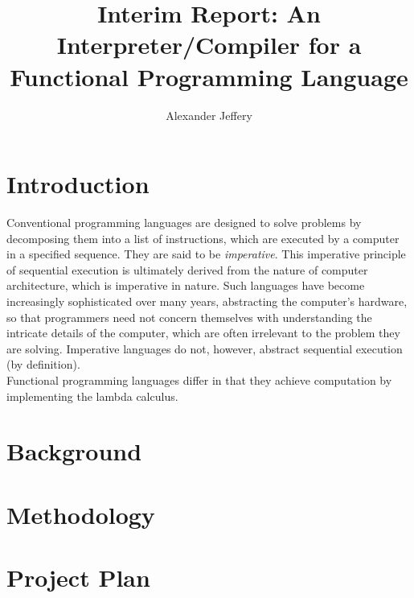 \documentclass{article}
\title{\textbf{Interim Report}: An Interpreter/Compiler for a Functional Programming Language}
\author{Alexander Jeffery}
\begin{document}
\maketitle

\section{Introduction}

Conventional programming languages are designed to solve problems by decomposing them into a list of instructions, which are executed by a computer in a specified sequence. They are said to be \emph{imperative}. This imperative principle of sequential execution is ultimately derived from the nature of computer architecture, which is imperative in nature. Such languages have become increasingly sophisticated over many years, abstracting the computer's hardware, so that programmers need not concern themselves with understanding the intricate details of the computer, which are often irrelevant to the problem they are solving. Imperative languages do not, however, abstract sequential execution (by definition).
\\
Functional programming languages differ in that they achieve computation by implementing the lambda calculus.

\section{Background}

\section{Methodology}

\section{Project Plan}
\end{document}
